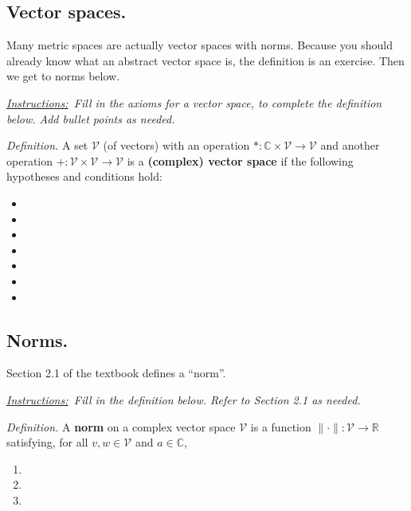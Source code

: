 \documentclass[12pt]{article}
\newcommand{\cV}{\mathcal{V}}
\newcommand{\CC}{\mathbb{C}}
\newcommand{\RR}{\mathbb{R}}
\newcommand{\sect}[1]{\subsection*{#1.}}
\newcommand{\defin}{\emph{Definition.}\,\,}
\newcommand{\instruct}[2]{\emph{\underline{Instructions:}\, #2} \vspace*{#1mm}}
\begin{document}
\sect{Vector spaces}  Many metric spaces are actually vector spaces with norms.  Because you should already know what an abstract vector space is, the definition is an exercise.  Then we get to norms below.

\instruct{0}{Fill in the axioms for a vector space, to complete the definition below.  Add bullet points as needed.}

\defin A set $\cV$ (of vectors) with an operation $*:\CC\times \cV \to \cV$ and another operation $+:\cV\times \cV\to \cV$ is a \textbf{(complex) vector space} if the following hypotheses and conditions hold:
\begin{itemize}
\item \phantom{x} \vspace{5mm}

\item \phantom{x} \vspace{5mm}

\item \phantom{x} \vspace{5mm}

\item \phantom{x} \vspace{5mm}

\item \phantom{x} \vspace{5mm}

\item \phantom{x} \vspace{5mm}

\item \phantom{x} \vspace{25mm}

\end{itemize}


\sect{Norms} \label{topic:norms}

Section 2.1 of the textbook defines a ``norm''.

\instruct{0}{Fill in the definition below.  Refer to Section 2.1 as needed.}

\defin A \textbf{norm} on a complex vector space $\cV$ is a function $\|\cdot\|:\cV \to \RR$ satisfying, for all $v,w\in\cV$ and $a\in \CC$,
\begin{enumerate}
\item \phantom{foo} \vspace{5mm}

\item \phantom{foo} \vspace{5mm}

\item \phantom{foo} \vspace{7mm}

\end{enumerate}
\end{document}
